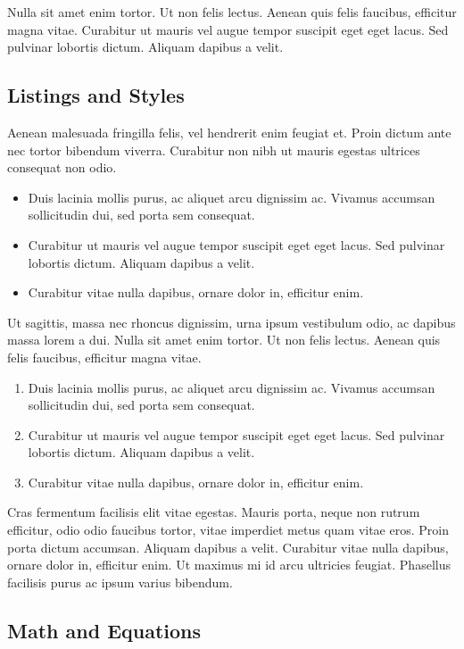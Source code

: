 \documentclass[sigconf, nonacm]{acmart}
\begin{document}
Nulla sit amet enim tortor. Ut non felis lectus. Aenean quis felis faucibus, efficitur magna vitae. Curabitur ut mauris vel augue tempor suscipit eget eget lacus. Sed pulvinar lobortis dictum. Aliquam dapibus a velit.

\subsection{Listings and Styles}

Aenean malesuada fringilla felis, vel hendrerit enim feugiat et. Proin dictum ante nec tortor bibendum viverra. Curabitur non nibh ut mauris egestas ultrices consequat non odio.

\begin{itemize}
\item Duis lacinia mollis purus, ac aliquet arcu dignissim ac. Vivamus accumsan sollicitudin dui, sed porta sem consequat.
\item Curabitur ut mauris vel augue tempor suscipit eget eget lacus. Sed pulvinar lobortis dictum. Aliquam dapibus a velit.
\item Curabitur vitae nulla dapibus, ornare dolor in, efficitur enim.
\end{itemize}

Ut sagittis, massa nec rhoncus dignissim, urna ipsum vestibulum odio, ac dapibus massa lorem a dui. Nulla sit amet enim tortor. Ut non felis lectus. Aenean quis felis faucibus, efficitur magna vitae. 

\begin{enumerate}
\item Duis lacinia mollis purus, ac aliquet arcu dignissim ac. Vivamus accumsan sollicitudin dui, sed porta sem consequat.
\item Curabitur ut mauris vel augue tempor suscipit eget eget lacus. Sed pulvinar lobortis dictum. Aliquam dapibus a velit.
\item Curabitur vitae nulla dapibus, ornare dolor in, efficitur enim.
\end{enumerate}

Cras fermentum facilisis elit vitae egestas. Mauris porta, neque non rutrum efficitur, odio odio faucibus tortor, vitae imperdiet metus quam vitae eros. Proin porta dictum accumsan. Aliquam dapibus a velit. Curabitur vitae nulla dapibus, ornare dolor in, efficitur enim. Ut maximus mi id arcu ultricies feugiat. Phasellus facilisis purus ac ipsum varius bibendum.

\subsection{Math and Equations}
\end{document}
